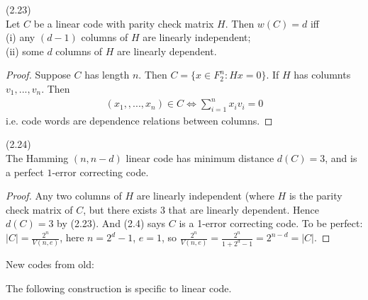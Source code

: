 \documentclass[a4paper]{article}
\begin{document}
\begin{lemma} (2.23)\\
Let $C$ be a linear code with parity check matrix $H$. Then $w(C) = d$ iff\\
(i) any $(d-1)$ columns of $H$ are linearly independent;\\
(ii) some $d$ columns of $H$ are linearly dependent.
\begin{proof}
Suppose $C$ has length $n$. Then $C = \{x \in F_2^n: Hx = 0\}$. If $H$ has columnts $v_1,...,v_n$. Then
\begin{equation*}
\begin{aligned}
(x_1,,...,x_n) \in C \iff \sum_{i=1}^n x_i v_i = 0
\end{aligned}
\end{equation*}
i.e. code words are dependence relations between columns.
\end{proof}
\end{lemma}

\begin{lemma} (2.24)\\
The Hamming $(n,n-d)$ linear code has minimum distance $d(C) = 3$, and is a perfect $1$-error correcting code.
\begin{proof}
Any two columns of $H$ are linearly independent (where $H$ is the parity check matrix of $C$, but there exists $3$ that are linearly dependent. Hence $d(C) = 3$ by (2.23). And (2.4) says $C$ is a 1-error correcting code. To be perfect: $|C| = \frac{2^n}{V(n,e)}$, here $n = 2^d - 1$, $e=1$, so $\frac{2^n}{V(n,e)} = \frac{2^n}{1+2^d-1} = 2^{n-d} = |C|$.
\end{proof}
\end{lemma}

New codes from old:

The following construction is specific to linear code.
\end{document}

